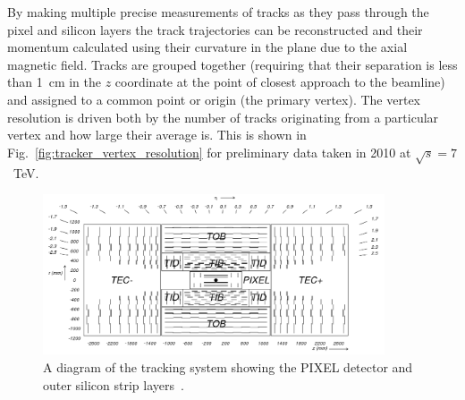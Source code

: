 By making multiple precise measurements of tracks as they pass through the pixel and silicon layers the track trajectories can be reconstructed and their momentum calculated using their curvature in the \phi plane due to the axial magnetic field. Tracks are grouped together (requiring that their separation is less than 1~cm in the $z$ coordinate at the point of closest approach to the beamline) and assigned to a common point or origin (the primary vertex). The vertex resolution is driven both by the number of tracks originating from a particular vertex and how large their average \pT is. This is shown in Fig.~\ref{fig:tracker_vertex_resolution} for preliminary data taken in 2010 at $\sqrt{s}=7$~TeV.

\begin{figure}
  \includegraphics[width=0.9\textwidth]{cms_experiment/plots/fig_cmstracker.png}
  \caption[\acs{CMS} tracker]{A diagram of the \CMS tracking system showing the PIXEL detector and outer silicon strip layers~\cite{CMS_JINST}.}
  \label{fig:cms_tracker}
\end{figure}

